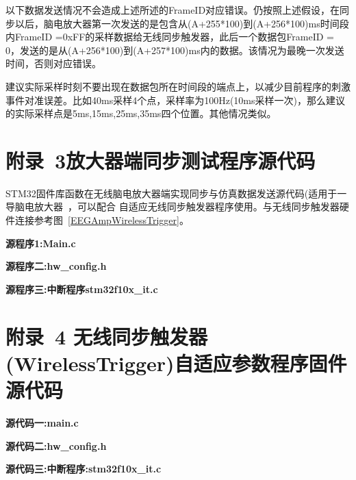 	以下数据发送情况不会造成上述所述的FrameID对应错误。仍按照上述假设，在同步以后，脑电放大器第一次发送的是包含从(A+255*100)到(A+256*100)ms时间段内FrameID =0xFF的采样数据给无线同步触发器，此后一个数据包FrameID = 0，发送的是从(A+256*100)到(A+257*100)ms内的数据。该情况为最晚一次发送时间，否则对应错误。

	建议实际采样时刻不要出现在数据包所在时间段的端点上，以减少目前程序的刺激事件对准误差。比如40ms采样4个点，采样率为100Hz(10ms采样一次)，那么建议的实际采样点是5ms,15ms,25ms,35ms四个位置。其他情况类似。

\section*{附录~3\quad 放大器端同步测试程序源代码}
STM32固件库函数在无线脑电放大器端实现同步与仿真数据发送源代码(适用于一导脑电放大器~\cite{Xu2009}，可以配合 自适应无线同步触发器程序使用。与无线同步触发器硬件连接参考图~\ref{EEGAmpWirelessTrigger}。

\textbf{源程序1:Main.c}
		
\textbf{源程序二:hw\_{}config.h}



\textbf{源程序三:中断程序stm32f10x\_{}it.c}



\section*{附录~4 \quad 无线同步触发器(WirelessTrigger)自适应参数程序固件源代码}
\label{appendix}

\textbf{源代码一:main.c}



\textbf{源代码二:hw\_{}config.h}



\textbf{源代码三:中断程序:stm32f10x\_{}it.c}


\newpage
